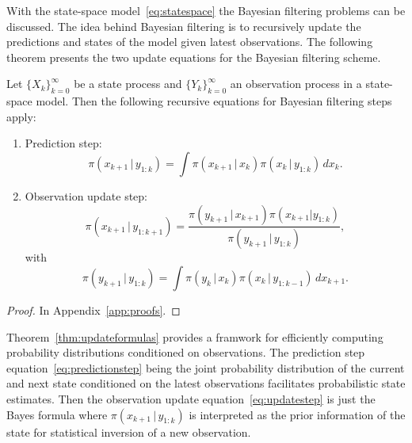 With the state-space model~\eqref{eq:statespace} the Bayesian filtering problems can be discussed.
The idea behind Bayesian filtering is to recursively update the predictions and states of the model given latest observations.
The following theorem presents the two update equations for the Bayesian filtering scheme.
\begin{theorem}\label{thm:updateformulas}
    Let $\{X_k\}_{k=0}^{\infty}$ be a state process and $\{Y_k\}_{k=0}^{\infty}$ an observation process in a state-space model.
    Then the following recursive equations for Bayesian filtering steps apply:
    \begin{enumerate}
        \item 
            Prediction step:
            \begin{equation}\label{eq:predictionstep}
                \pi (x_{k+1} \, \vert \, y_{1:k}) = \int \pi (x_{k+1} \, \vert \, x_k) \pi (x_k \, \vert \, y_{1:k}) \, d x_k.
            \end{equation}
        \item
            Observation update step:
            \begin{equation}\label{eq:updatestep}
                \pi(x_{k+1} \, \vert \, y_{1:k+1}) = \frac{\pi (y_{k+1} \, \vert \, x_{k+1}) \pi (x_{k+1} | y_{1:k})}{\pi (y_{k+1} \, \vert \, y_{1:k})},
            \end{equation}
            with
            \begin{equation*}
                \pi (y_{k+1} \, \vert \, y_{1:k}) = \int \pi (y_k \, \vert \, x_k) \pi (x_k \, \vert \, y_{1:k-1}) \, d x_{k+1}.
            \end{equation*}
    \end{enumerate}
\end{theorem}
\begin{proof}
    In Appendix~\ref{app:proofs}.
\end{proof}

Theorem~\ref{thm:updateformulas} provides a framwork for efficiently computing probability distributions conditioned on observations.
The prediction step equation~\ref{eq:predictionstep} being the joint probability distribution of the current and next state conditioned on the latest observations facilitates probabilistic state estimates.
Then the observation update equation~\ref{eq:updatestep} is just the Bayes formula where $\pi (x_{k+1} \, \vert \, y_{1:k})$ is interpreted as the prior information of the state for statistical inversion of a new observation.

